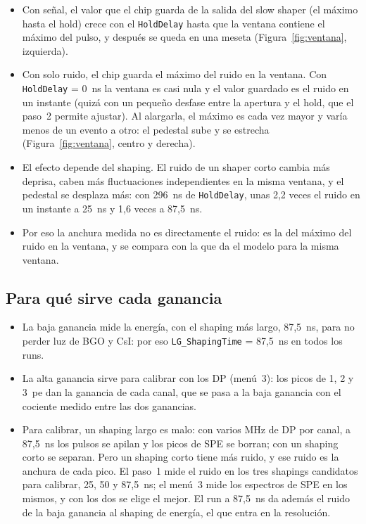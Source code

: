 \documentclass[11pt,a4paper]{article}
\begin{document}
\begin{itemize}
\item Con señal, el valor que el chip guarda de la salida del slow shaper
  (el máximo hasta el hold) crece con el \texttt{HoldDelay} hasta
  que la ventana contiene el máximo del pulso, y después se queda en una
  meseta (Figura~\ref{fig:ventana}, izquierda).
\item Con solo ruido, el chip guarda el máximo del ruido en la ventana. Con
  \texttt{HoldDelay} = 0~ns la ventana es casi nula y el valor guardado es
  el ruido en un instante (quizá con un pequeño desfase entre la apertura y
  el hold, que el paso~2 permite ajustar). Al alargarla, el máximo es cada vez
  mayor y varía menos de un evento a otro: el pedestal sube y se estrecha
  (Figura~\ref{fig:ventana}, centro y derecha).
\item El efecto depende del shaping. El ruido de un shaper corto cambia más
  deprisa, caben más fluctuaciones independientes en la misma ventana, y el
  pedestal se desplaza más: con 296~ns de \texttt{HoldDelay}, unas 2,2 veces
  el ruido en un instante a 25~ns y 1,6 veces a 87,5~ns.
\item Por eso la anchura medida no es directamente el ruido: es la del
  máximo del ruido en la ventana, y se compara con la que da el modelo para
  la misma ventana.
\end{itemize}

\subsection*{Para qué sirve cada ganancia}

\begin{itemize}
\item La baja ganancia mide la energía, con el shaping más largo, 87,5~ns,
  para no perder luz de BGO y CsI: por eso \texttt{LG\_ShapingTime} =
  87,5~ns en todos los runs.
\item La alta ganancia sirve para calibrar con los DP (menú~3): los picos de
  1, 2 y 3~pe dan la ganancia de cada canal, que se pasa a la baja ganancia
  con el cociente medido entre las dos ganancias.
\item Para calibrar, un shaping largo es malo: con varios MHz de DP por
  canal, a 87,5~ns los pulsos se apilan y los picos de SPE se borran; con un
  shaping corto se separan. Pero un shaping corto tiene más ruido, y ese
  ruido es la anchura de cada pico. El paso~1 mide el ruido en los tres
  shapings candidatos para calibrar, 25, 50 y 87,5~ns; el menú~3 mide los
  espectros de SPE en los mismos, y con los dos se elige el mejor. El run a
  87,5~ns da además el ruido de la baja ganancia al shaping de energía, el
  que entra en la resolución.
\end{itemize}
\end{document}
